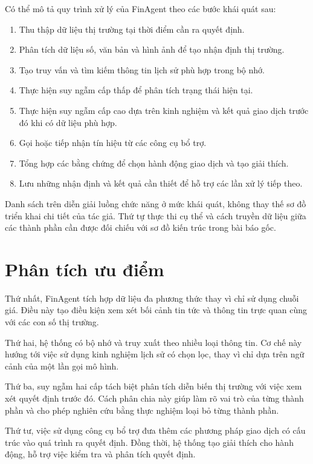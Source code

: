 Có thể mô tả quy trình xử lý của FinAgent theo các bước khái quát sau:
\begin{enumerate}
    \item Thu thập dữ liệu thị trường tại thời điểm cần ra quyết định.
    \item Phân tích dữ liệu số, văn bản và hình ảnh để tạo nhận định thị trường.
    \item Tạo truy vấn và tìm kiếm thông tin lịch sử phù hợp trong bộ nhớ.
    \item Thực hiện suy ngẫm cấp thấp để phân tích trạng thái hiện tại.
    \item Thực hiện suy ngẫm cấp cao dựa trên kinh nghiệm và kết quả giao dịch trước đó khi có dữ liệu phù hợp.
    \item Gọi hoặc tiếp nhận tín hiệu từ các công cụ bổ trợ.
    \item Tổng hợp các bằng chứng để chọn hành động giao dịch và tạo giải thích.
    \item Lưu những nhận định và kết quả cần thiết để hỗ trợ các lần xử lý tiếp theo.
\end{enumerate}
Danh sách trên diễn giải luồng chức năng ở mức khái quát, không thay thế sơ đồ triển khai chi tiết của tác giả. Thứ tự thực thi cụ thể và cách truyền dữ liệu giữa các thành phần cần được đối chiếu với sơ đồ kiến trúc trong bài báo gốc.

\section{Phân tích ưu điểm}

Thứ nhất, FinAgent tích hợp dữ liệu đa phương thức thay vì chỉ sử dụng chuỗi giá. Điều này tạo điều kiện xem xét bối cảnh tin tức và thông tin trực quan cùng với các con số thị trường.

Thứ hai, hệ thống có bộ nhớ và truy xuất theo nhiều loại thông tin. Cơ chế này hướng tới việc sử dụng kinh nghiệm lịch sử có chọn lọc, thay vì chỉ dựa trên ngữ cảnh của một lần gọi mô hình.

Thứ ba, suy ngẫm hai cấp tách biệt phân tích diễn biến thị trường với việc xem xét quyết định trước đó. Cách phân chia này giúp làm rõ vai trò của từng thành phần và cho phép nghiên cứu bằng thực nghiệm loại bỏ từng thành phần.

Thứ tư, việc sử dụng công cụ bổ trợ đưa thêm các phương pháp giao dịch có cấu trúc vào quá trình ra quyết định. Đồng thời, hệ thống tạo giải thích cho hành động, hỗ trợ việc kiểm tra và phân tích quyết định.

